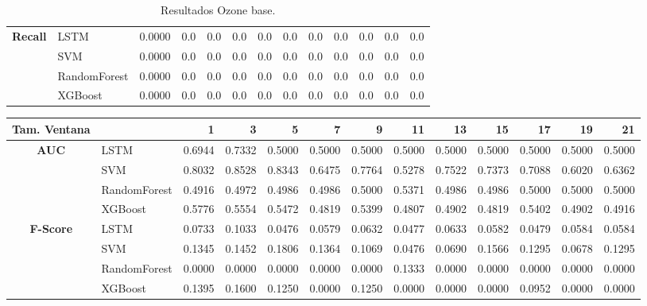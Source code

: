 \begin{table}[h]
\begin{adjustbox}{max width=11cm}
\begin{tabular}{|c|l|r|r|r|r|r|r|r|r|r|r|r|}
			\hline
			\textbf{Recall} & LSTM &  0.0000 &  0.0 &  0.0 &  0.0 &  0.0 &  0.0 &  0.0 &  0.0 &  0.0 &  0.0 &  0.0 \\
			& SVM &  0.0000 &  0.0 &  0.0 &  0.0 &  0.0 &  0.0 &  0.0 &  0.0 &  0.0 &  0.0 &  0.0 \\
			& RandomForest &  0.0000 &  0.0 &  0.0 &  0.0 &  0.0 &  0.0 &  0.0 &  0.0 &  0.0 &  0.0 &  0.0 \\
			& XGBoost &  0.0000 &  0.0 &  0.0 &  0.0 &  0.0 &  0.0 &  0.0 &  0.0 &  0.0 &  0.0 &  0.0 \\
			\hline
		\end{tabular}
	\end{adjustbox}
	\caption{Resultados Ozone base.}
	\label{tab:Ozone_base}
\end{table}
\newpage
\begin{table}[h]
	\centering
	\begin{adjustbox}{max width=15cm}
		\begin{tabular}{|c|l|r|r|r|r|r|r|r|r|r|r|r|}
			\hline
			\textbf{Tam. Ventana} &         &      1  &      3  &      5  &      7  &      9  &      11 &      13 &      15 &      17 &      19 &      21 \\
			\hline
			\textbf{AUC} & LSTM &  0.6944 &  0.7332 &  0.5000 &  0.5000 &  0.5000 &  0.5000 &  0.5000 &  0.5000 &  0.5000 &  0.5000 &  0.5000 \\
			& SVM &  0.8032 &  0.8528 &  0.8343 &  0.6475 &  0.7764 &  0.5278 &  0.7522 &  0.7373 &  0.7088 &  0.6020 &  0.6362 \\
			& RandomForest &  0.4916 &  0.4972 &  0.4986 &  0.4986 &  0.5000 &  0.5371 &  0.4986 &  0.4986 &  0.5000 &  0.5000 &  0.5000 \\
			& XGBoost &  0.5776 &  0.5554 &  0.5472 &  0.4819 &  0.5399 &  0.4807 &  0.4902 &  0.4819 &  0.5402 &  0.4902 &  0.4916 \\
			\hline
			\textbf{F-Score} & LSTM &  0.0733 &  0.1033 &  0.0476 &  0.0579 &  0.0632 &  0.0477 &  0.0633 &  0.0582 &  0.0479 &  0.0584 &  0.0584 \\
			& SVM &  0.1345 &  0.1452 &  0.1806 &  0.1364 &  0.1069 &  0.0476 &  0.0690 &  0.1566 &  0.1295 &  0.0678 &  0.1295 \\
			& RandomForest &  0.0000 &  0.0000 &  0.0000 &  0.0000 &  0.0000 &  0.1333 &  0.0000 &  0.0000 &  0.0000 &  0.0000 &  0.0000 \\
			& XGBoost &  0.1395 &  0.1600 &  0.1250 &  0.0000 &  0.1250 &  0.0000 &  0.0000 &  0.0000 &  0.0952 &  0.0000 &  0.0000 \\

\end{tabular}
\end{adjustbox}
\end{table}
